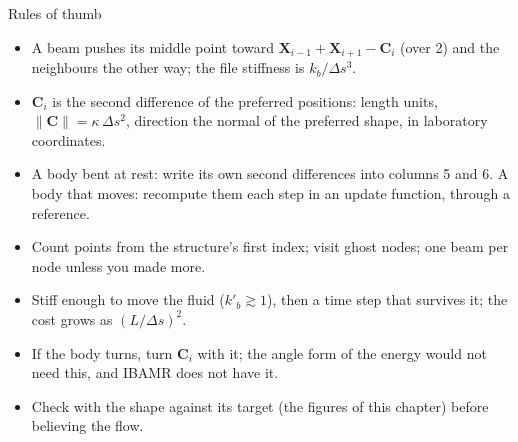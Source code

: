 \documentclass[aspectratio=169,11pt]{beamer}
\begin{document}
\begin{frame}{Rules of thumb}
\label{fr:thumb}
\small
\begin{itemize}
  \item A beam pushes its middle point toward $\mathbf{X}_{i-1} + \mathbf{X}_{i+1} - \mathbf{C}_i$ (over 2) and the neighbours the other way; the file stiffness is $k_b/\Delta s^3$.
  \item $\mathbf{C}_i$ is the second difference of the preferred positions: length units, $\|\mathbf{C}\| = \kappa\,\Delta s^2$, direction the normal of the preferred shape, in laboratory coordinates.
  \item A body bent at rest: write its own second differences into columns 5 and 6. A body that moves: recompute them each step in an update function, through a reference.
  \item Count points from the structure's first index; visit ghost nodes; one beam per node unless you made more.
  \item Stiff enough to move the fluid ($k'_b \gtrsim 1$), then a time step that survives it; the cost grows as $(L/\Delta s)^2$.
  \item If the body turns, turn $\mathbf{C}_i$ with it; the angle form of the energy would not need this, and IBAMR does not have it.
  \item Check with the shape against its target (the figures of this chapter) before believing the flow.
\end{itemize}
\end{frame}
\end{document}
